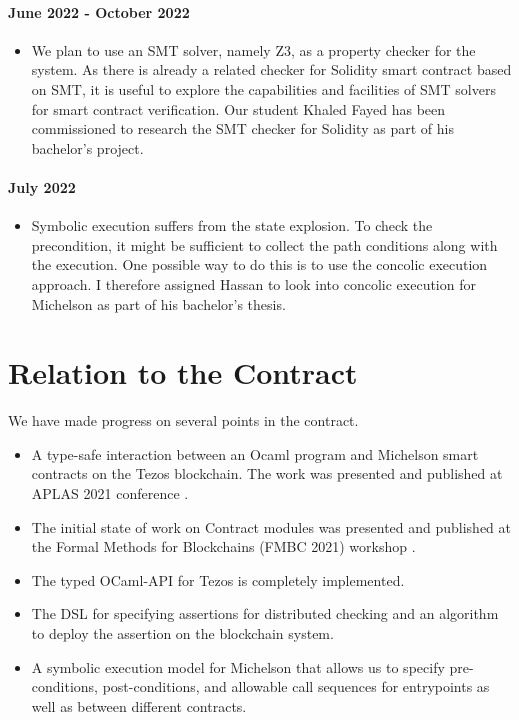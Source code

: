 \documentclass[a4paper,11pt]{article}
\begin{document}
\paragraph{June 2022 - October 2022} 
\begin{itemize}
\item We plan to use an SMT solver, namely Z3, as a property checker for the system. As there is already a related checker for Solidity smart contract based on SMT, it is useful to  explore the capabilities and facilities of SMT solvers for smart contract verification. Our student  Khaled Fayed has been commissioned to research the SMT checker for Solidity as part of his bachelor's project. 
\end{itemize}

\paragraph{July 2022}
\begin{itemize}
\item Symbolic execution suffers from the state explosion. To check the precondition, it might be sufficient to collect the path conditions along with the execution. One possible way to do this is to use the concolic execution approach. I therefore assigned Hassan to look into concolic execution for Michelson as part of his bachelor's thesis.
\end{itemize}

\section{Relation to the Contract}
\label{sec:relation-contract}

We have made progress on several points in the contract.
\begin{itemize}
\item A type-safe interaction between an Ocaml program and Michelson smart contracts on the Tezos blockchain. The work was presented and published at APLAS 2021 conference \cite{DBLP:conf/fc/ThiemannAplas21}. 
\item The initial state of work on Contract modules was presented and published at the Formal Methods for Blockchains (FMBC 2021) workshop \cite{DBLP:conf/fc/ThiemannFmbc21}.

\item The typed OCaml-API for Tezos is completely implemented.
\item The DSL for specifying assertions for distributed checking and an algorithm to  deploy the assertion on the blockchain system.
\item A symbolic execution model for Michelson that allows us to specify pre-conditions, post-conditions, and allowable call sequences for entrypoints as well as between different contracts. 
\end{itemize}
\end{document}
